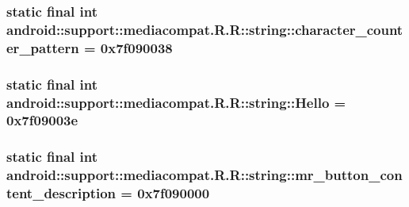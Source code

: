 \hypertarget{classandroid_1_1support_1_1mediacompat_1_1_r_1_1string_df980ced932f2e84f68e201c9cf5c59d}{
\subsubsection[{character\_\-counter\_\-pattern}]{\setlength{\rightskip}{0pt plus 5cm}static final int android::support::mediacompat.R.R::string::character\_\-counter\_\-pattern = 0x7f090038}}
\label{classandroid_1_1support_1_1mediacompat_1_1_r_1_1string_df980ced932f2e84f68e201c9cf5c59d}


\hypertarget{classandroid_1_1support_1_1mediacompat_1_1_r_1_1string_14ee04e4e4133f4d8b684c725c1bc68b}{
\subsubsection[{Hello}]{\setlength{\rightskip}{0pt plus 5cm}static final int android::support::mediacompat.R.R::string::Hello = 0x7f09003e}}
\label{classandroid_1_1support_1_1mediacompat_1_1_r_1_1string_14ee04e4e4133f4d8b684c725c1bc68b}


\hypertarget{classandroid_1_1support_1_1mediacompat_1_1_r_1_1string_4dbb598806bf274f97429af130ae021d}{
\subsubsection[{mr\_\-button\_\-content\_\-description}]{\setlength{\rightskip}{0pt plus 5cm}static final int android::support::mediacompat.R.R::string::mr\_\-button\_\-content\_\-description = 0x7f090000}}
\label{classandroid_1_1support_1_1mediacompat_1_1_r_1_1string_4dbb598806bf274f97429af130ae021d}


